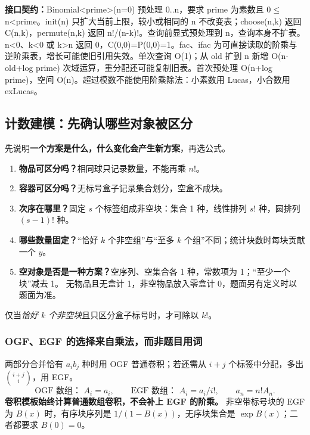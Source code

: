 {\sloppy{}\noindent\textbf{接口契约：}Binomial<prime>(n=0) 预处理 0..n，要求 prime 为素数且 0$\le$n<prime。init(n) 只扩大当前上限，较小或相同的 n 不改变表；choose(n,k) 返回 C(n,k)，permute(n,k) 返回 n!/(n-k)!。查询前显式预处理到 n，查询本身不扩表。n<0、k<0 或 k>n 返回 0，C(0,0)=P(0,0)=1。fac、ifac 为可直接读取的阶乘与逆阶乘表，增长可能使旧引用失效。单次查询 O(1)；从 old 扩到 n 新增 O(n-old+log prime) 次域运算，重分配还可能复制旧表。首次预处理 O(n+log prime)，空间 O(n)。超过模数不能使用阶乘除法：小素数用 Lucas，小合数用 exLucas。\par}



\Needspace{220pt}



\subsection{计数建模：先确认哪些对象被区分}\label{knowledge-counting-model}
先说明\textbf{一个方案是什么，什么变化会产生新方案}，再选公式。
\begin{enumerate}
\item \textbf{物品可区分吗？}相同球只记录数量，不能再乘 $n!$。
\item \textbf{容器可区分吗？}无标号盒子记录集合划分，空盒不成块。
\item \textbf{次序在哪里？}固定 $s$ 个标签组成非空块：集合 1 种，线性排列 $s!$ 种，圆排列 $(s-1)!$ 种。
\item \textbf{哪些数量固定？}“恰好 $k$ 个非空组”与“至多 $k$ 个组”不同；统计块数时每块贡献一个 $y$。
\item \textbf{空对象是否是一种方案？}空序列、空集合各 1 种，常数项为 1；“至少一个块”减去 1。
无物品且无盒计 1，非空物品放入零盒计 0，题面另有定义时以题面为准。
\end{enumerate}
仅当\emph{恰好 $k$ 个非空块}且只区分盒子标号时，才可除以 $k!$。

\subsubsection{OGF、EGF 的选择来自乘法，而非题目用词}
两部分合并恰有 $a_ib_j$ 种时用 OGF 普通卷积；若还需从 $i+j$ 个标签中分配，多出 $\binom{i+j}{i}$，用 EGF。
\[
\text{OGF 数组： }A_i=a_i,\qquad
\text{EGF 数组： }A_i=a_i/i!,\qquad a_n=n!A_n.
\]
\textbf{卷积模板始终计算普通数组卷积，不会补上 EGF 的阶乘。}
非空带标号块的 EGF 为 $B(x)$ 时，有序块序列是 $1/(1-B(x))$，无序块集合是 $\exp B(x)$；二者都要求 $B(0)=0$。



